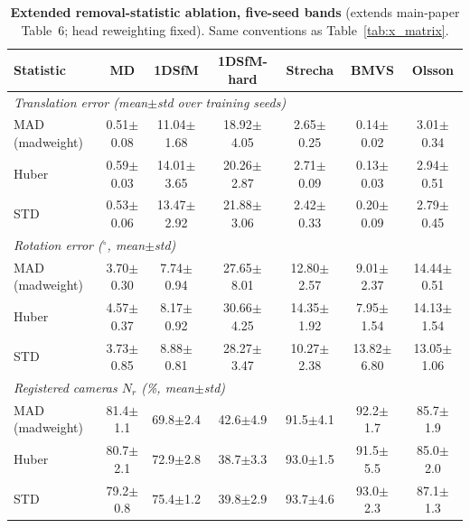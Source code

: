 \documentclass[10pt,twocolumn,letterpaper]{article}
\renewcommand{\deg}{^{\circ}}
\begin{document}
\begin{table}[t]\centering\footnotesize
\caption{\textbf{Extended removal-statistic ablation, five-seed bands} (extends
main-paper Table~6; head reweighting fixed). Same conventions as Table~\ref{tab:x_matrix}.}
\label{tab:x_madstat}
\setlength{\tabcolsep}{3pt}%
\begin{tabular}{lcccccc}
\toprule
Statistic & MD & 1DSfM & 1DSfM-hard & Strecha & BMVS & Olsson\\
\midrule
\multicolumn{7}{l}{\emph{Translation error (mean$\pm$std over training seeds)}}\\[1pt]
MAD (madweight) & 0.51$\pm$0.08 & 11.04$\pm$1.68 & 18.92$\pm$4.05 & 2.65$\pm$0.25 & 0.14$\pm$0.02 & 3.01$\pm$0.34\\
Huber & 0.59$\pm$0.03 & 14.01$\pm$3.65 & 20.26$\pm$2.87 & 2.71$\pm$0.09 & 0.13$\pm$0.03 & 2.94$\pm$0.51\\
STD & 0.53$\pm$0.06 & 13.47$\pm$2.92 & 21.88$\pm$3.06 & 2.42$\pm$0.33 & 0.20$\pm$0.09 & 2.79$\pm$0.45\\
\midrule
\multicolumn{7}{l}{\emph{Rotation error ($\deg$, mean$\pm$std)}}\\[1pt]
MAD (madweight) & 3.70$\pm$0.30 & 7.74$\pm$0.94 & 27.65$\pm$8.01 & 12.80$\pm$2.57 & 9.01$\pm$2.37 & 14.44$\pm$0.51\\
Huber & 4.57$\pm$0.37 & 8.17$\pm$0.92 & 30.66$\pm$4.25 & 14.35$\pm$1.92 & 7.95$\pm$1.54 & 14.13$\pm$1.54\\
STD & 3.73$\pm$0.85 & 8.88$\pm$0.81 & 28.27$\pm$3.47 & 10.27$\pm$2.38 & 13.82$\pm$6.80 & 13.05$\pm$1.06\\
\midrule
\multicolumn{7}{l}{\emph{Registered cameras $N_r$ (\%, mean$\pm$std)}}\\[1pt]
MAD (madweight) & 81.4$\pm$1.1 & 69.8$\pm$2.4 & 42.6$\pm$4.9 & 91.5$\pm$4.1 & 92.2$\pm$1.7 & 85.7$\pm$1.9\\
Huber & 80.7$\pm$2.1 & 72.9$\pm$2.8 & 38.7$\pm$3.3 & 93.0$\pm$1.5 & 91.5$\pm$5.5 & 85.0$\pm$2.0\\
STD & 79.2$\pm$0.8 & 75.4$\pm$1.2 & 39.8$\pm$2.9 & 93.7$\pm$4.6 & 93.0$\pm$2.3 & 87.1$\pm$1.3\\
\bottomrule
\end{tabular}
\end{table}
\end{document}
